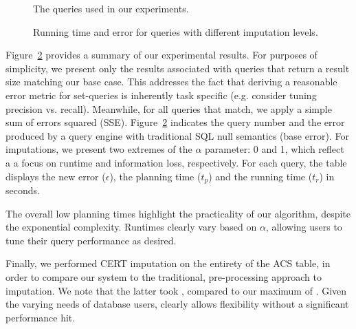 \begin{figure}
  \centerfloat
  
  \caption{The queries used in our experiments.}
  \label{fig:queries}
\end{figure}

\begin{figure}
  \centerfloat
  
  \caption{Running time and error for queries with different imputation levels.}
  \label{fig:experiments}
\end{figure}

Figure~\ref{fig:experiments} provides a summary of our experimental results. For purposes of simplicity, we present only the results associated with
queries that return a result size matching our base case. This addresses the fact that deriving a reasonable error metric for set-queries 
is inherently task specific (e.g. consider tuning precision vs. recall). Meanwhile, for all queries that match, we apply a simple sum of errors squared
(SSE). Figure~\ref{fig:experiments} indicates the query number and the error produced by a query engine with traditional SQL null semantics (base error).
For imputations, we present two extremes of the $\alpha$ parameter: 0 and 1, which reflect a a focus on runtime and information loss, respectively.
For each query, the table displays the new error ($\epsilon$), the planning time ($t_p$) and the running time ($t_r$) in seconds.

The overall low planning times highlight the practicality of our algorithm, despite the exponential complexity. Runtimes clearly vary based on $\alpha$, allowing
users to tune their query performance as desired.


Finally, we performed CERT imputation on the entirety of the ACS table, in order to compare our system to the traditional, pre-processing approach to imputation.
We note that the latter took , compared to our maximum of . Given the varying needs of database users, \ProjectName{} clearly allows flexibility without
a significant performance hit.


